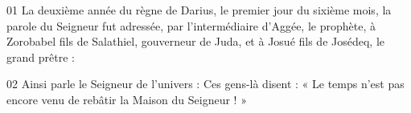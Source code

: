 01 La deuxième année du règne de Darius, le premier jour du sixième mois, la parole du Seigneur fut adressée, par l’intermédiaire d’Aggée, le prophète, à Zorobabel fils de Salathiel, gouverneur de Juda, et à Josué fils de Josédeq, le grand prêtre :

02 Ainsi parle le Seigneur de l’univers : Ces gens-là disent : « Le temps n’est pas encore venu de rebâtir la Maison du Seigneur ! »
